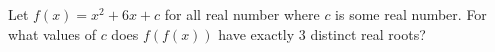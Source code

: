 Let $f(x) = x^2 + 6x + c$ for all real number  where $c$ is some real number.  For what values of $c$ does $f(f(x))$ have exactly $3$ distinct real roots?